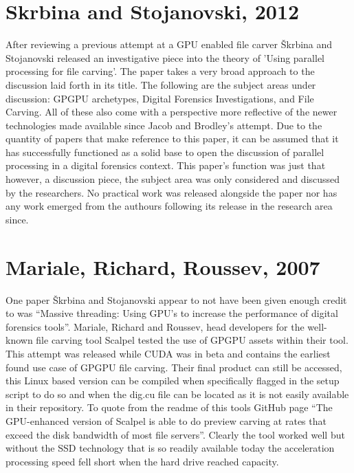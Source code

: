 \section*{Skrbina and Stojanovski, 2012}
After reviewing a previous attempt at a \ac{GPU} enabled file carver Škrbina and Stojanovski released an investigative piece into the theory of ’Using parallel processing for file carving’.
The paper takes a very broad approach to the discussion laid forth in its title.
The following are the subject areas under discussion: \ac{GPGPU} archetypes, Digital Forensics Investigations, and File Carving.
All of these also come with a perspective more reflective of the newer technologies made available since Jacob and Brodley’s attempt.
Due to the quantity of papers that make reference to this paper, it can be assumed that it has successfully functioned as a solid base to open the discussion of parallel processing in a digital forensics context.
This paper’s function was just that however, a discussion piece, the subject area was only considered and discussed by the researchers.
No practical work was released alongside the paper nor has any work emerged from the authours following its release in the research area since.

\section*{Mariale, Richard, Roussev, 2007}
One paper Škrbina and Stojanovski appear to not have been given enough credit to was ``Massive threading: Using \ac{GPU}’s to increase the performance of digital forensics tools''.
Mariale, Richard and Roussev, head developers for the well-known file carving tool Scalpel tested the use of \ac{GPGPU} assets within their tool.
This attempt was released while CUDA was in beta and contains the earliest found use case of \ac{GPGPU} file carving.
Their final product can still be accessed, this Linux based version can be compiled when specifically flagged in the setup script to do so and when the dig.cu file can be located as it is not easily available in their repository.
To quote from the readme of this tools GitHub page ``The \ac{GPU}-enhanced version of Scalpel is able to do preview carving at rates that exceed the disk bandwidth of most file servers''.
Clearly the tool worked well but without the \ac{SSD} technology that is so readily available today the acceleration processing speed fell short when the hard drive reached capacity.

